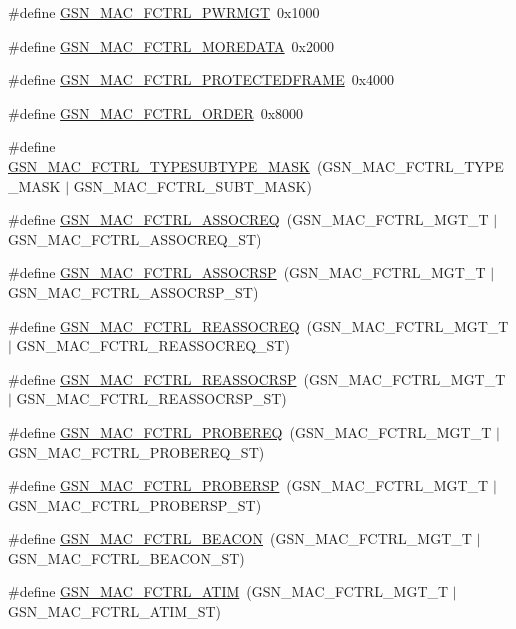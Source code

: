 \begin{DoxyCompactItemize}
\#define \hyperlink{a00523_ac403e480a0762d46d7dcafc79fdc497a}{GSN\_\-MAC\_\-FCTRL\_\-PWRMGT}~0x1000
\item 
\#define \hyperlink{a00523_ad6de82137f4685de8308859032f5ea2e}{GSN\_\-MAC\_\-FCTRL\_\-MOREDATA}~0x2000
\item 
\#define \hyperlink{a00523_ac867e059be49e2b75f04b83c2807774b}{GSN\_\-MAC\_\-FCTRL\_\-PROTECTEDFRAME}~0x4000
\item 
\#define \hyperlink{a00523_ab28d7c55b6e7fa6ab2c513785609fafc}{GSN\_\-MAC\_\-FCTRL\_\-ORDER}~0x8000
\item 
\#define \hyperlink{a00523_a22c7c71904dd6b601df39aef9e639aac}{GSN\_\-MAC\_\-FCTRL\_\-TYPESUBTYPE\_\-MASK}~(GSN\_\-MAC\_\-FCTRL\_\-TYPE\_\-MASK $|$ GSN\_\-MAC\_\-FCTRL\_\-SUBT\_\-MASK)
\item 
\#define \hyperlink{a00523_acd990fd07190c6f3eb0e58dd935fd5df}{GSN\_\-MAC\_\-FCTRL\_\-ASSOCREQ}~(GSN\_\-MAC\_\-FCTRL\_\-MGT\_\-T     $|$ GSN\_\-MAC\_\-FCTRL\_\-ASSOCREQ\_\-ST)
\item 
\#define \hyperlink{a00523_ad79a011e47575c3e14ebdd21bbae832a}{GSN\_\-MAC\_\-FCTRL\_\-ASSOCRSP}~(GSN\_\-MAC\_\-FCTRL\_\-MGT\_\-T     $|$ GSN\_\-MAC\_\-FCTRL\_\-ASSOCRSP\_\-ST)
\item 
\#define \hyperlink{a00523_a4b8e47007b45e0ce256f39fc30fcb1e3}{GSN\_\-MAC\_\-FCTRL\_\-REASSOCREQ}~(GSN\_\-MAC\_\-FCTRL\_\-MGT\_\-T     $|$ GSN\_\-MAC\_\-FCTRL\_\-REASSOCREQ\_\-ST)
\item 
\#define \hyperlink{a00523_ae0a942b0d0814b5372759a6150f52258}{GSN\_\-MAC\_\-FCTRL\_\-REASSOCRSP}~(GSN\_\-MAC\_\-FCTRL\_\-MGT\_\-T     $|$ GSN\_\-MAC\_\-FCTRL\_\-REASSOCRSP\_\-ST)
\item 
\#define \hyperlink{a00523_a15a46e4c8748a3351108855229ba85cf}{GSN\_\-MAC\_\-FCTRL\_\-PROBEREQ}~(GSN\_\-MAC\_\-FCTRL\_\-MGT\_\-T     $|$ GSN\_\-MAC\_\-FCTRL\_\-PROBEREQ\_\-ST)
\item 
\#define \hyperlink{a00523_ab5d32c08db8f92c1d1d27367e420bd5d}{GSN\_\-MAC\_\-FCTRL\_\-PROBERSP}~(GSN\_\-MAC\_\-FCTRL\_\-MGT\_\-T     $|$ GSN\_\-MAC\_\-FCTRL\_\-PROBERSP\_\-ST)
\item 
\#define \hyperlink{a00523_a0b434b38c7f3e6394611fb3bcbb2ac14}{GSN\_\-MAC\_\-FCTRL\_\-BEACON}~(GSN\_\-MAC\_\-FCTRL\_\-MGT\_\-T     $|$ GSN\_\-MAC\_\-FCTRL\_\-BEACON\_\-ST)
\item 
\#define \hyperlink{a00523_a8a475baf10ee0311404c95f5c7244c49}{GSN\_\-MAC\_\-FCTRL\_\-ATIM}~(GSN\_\-MAC\_\-FCTRL\_\-MGT\_\-T     $|$ GSN\_\-MAC\_\-FCTRL\_\-ATIM\_\-ST)
\item 

\end{DoxyCompactItemize}
